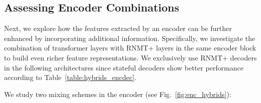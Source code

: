 \documentclass[11pt,a4paper]{article}
\begin{document}
\subsection{Assessing Encoder Combinations}
Next, we explore how the features extracted by an encoder can be
further enhanced by incorporating additional
information. Specifically, we investigate the combination of
transformer layers with RNMT+ layers in the same encoder block to build even richer feature representations.
We exclusively use RNMT+ decoders in the following architectures since stateful
decoders show better performance according to Table~\ref{table:hybrids_encdec}.





We study two mixing schemes in the encoder (see Fig.~\ref{fig:enc_hybrids}):
\end{document}
